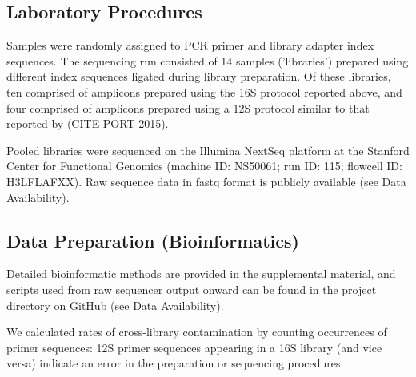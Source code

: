 \documentclass[11pt,letterpaper]{article} %
\begin{document}
\subsection*{Laboratory Procedures}

Samples were randomly assigned to PCR primer and library adapter index sequences.
The sequencing run consisted of 14 samples ('libraries') prepared using different index sequences ligated during library preparation.
Of these libraries, ten comprised of amplicons prepared using the 16S protocol reported above, and four comprised of amplicons prepared using a 12S protocol similar to that reported by (CITE PORT 2015).

Pooled libraries were sequenced on the Illumina NextSeq platform at the Stanford Center for Functional Genomics (machine ID: NS50061; run ID: 115; flowcell ID: H3LFLAFXX). Raw sequence data in fastq format is publicly available (see Data Availability).

\subsection*{Data Preparation (Bioinformatics)}

Detailed bioinformatic methods are provided in the supplemental material, and scripts used from raw sequencer output onward can be found in the project directory on GitHub (see Data Availability).



%
%
%
We calculated rates of cross-library contamination by counting occurrences of primer sequences: 12S primer sequences appearing in a 16S library (and vice versa) indicate an error in the preparation or sequencing procedures.
\end{document}
